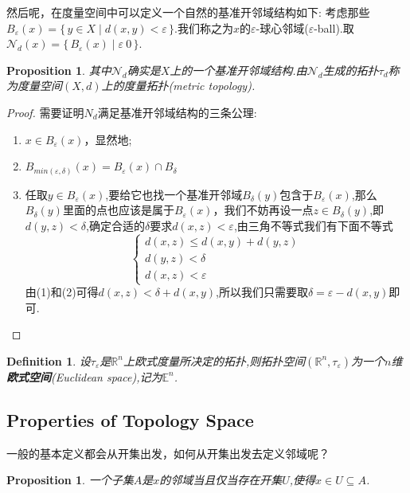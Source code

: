 \documentclass{article}
\newtheorem{proposition}[theorem]{Proposition}
\newtheorem{definition}[theorem]{Definition}
\newcommand\Set[2]{\{\,#1\mid#2\,\}} %
\begin{document}
然后呢，在度量空间中可以定义一个自然的基准开邻域结构如下: 考虑那些$B_{\varepsilon}(x)=\Set{y \in X}{d(x,y) < \varepsilon}$.我们称之为$x$的$\varepsilon$-球心邻域($\varepsilon$-ball).取$\mathcal{N}_d(x)=\Set{B_{\varepsilon}(x)}{\varepsilon \> 0}$.

\begin{proposition}
其中$\mathcal{N}_d$确实是$X$上的一个基准开邻域结构.由$\mathcal{N}_d$生成的拓扑$\tau_d$称为度量空间$(X,d)$上的度量拓扑(metric topology).
\end{proposition}

\begin{proof}
需要证明$N_d$满足基准开邻域结构的三条公理:
\begin{enumerate}
	\item $x \in B_\varepsilon(x)$，显然地;
	\item $B_{min(\varepsilon,\delta)}(x)=B_{\varepsilon}(x) \cap B_{\delta}$
	\item 任取$y \in B_{\varepsilon}(x)$,要给它也找一个基准开邻域$B_{\delta}(y)$包含于$B_{\varepsilon}(x)$,那么$B_{\delta}(y)$里面的点也应该是属于$B_{\varepsilon}(x)$，我们不妨再设一点$z \in B_{\delta}(y)$,即$d(y,z) < \delta$,确定合适的$\delta$要求$d(x,z) < \varepsilon$,由三角不等式我们有下面不等式 \[\left\{
		\begin{array}{l}
			d(x,z)\leq d(x,y) + d(y,z) \\ 
			d(y,z) < \delta  \\ 
			d(x,z) < \varepsilon 
		\end{array}
	\right.\]由(1)和(2)可得$d(x,z) < \delta + d(x,y)$,所以我们只需要取$\delta = \varepsilon - d(x,y)$即可.
\end{enumerate}
\end{proof}

\begin{definition}
设$\tau_\varepsilon$是$\mathbb{R}^n$上欧式度量所决定的拓扑,则拓扑空间$(\mathbb{R}^n,\tau_\varepsilon)$为一个$n$维\textbf{欧式空间}(Euclidean space),记为$\mathbb{E}^n$.
\end{definition}

\newpage
\subsection{Properties of Topology Space}

一般的基本定义都会从开集出发，如何从开集出发去定义邻域呢？

\begin{proposition}
一个子集$A$是$x$的邻域当且仅当存在开集$U$,使得$x \in U \subseteq A$.
\end{proposition}
\end{document}
